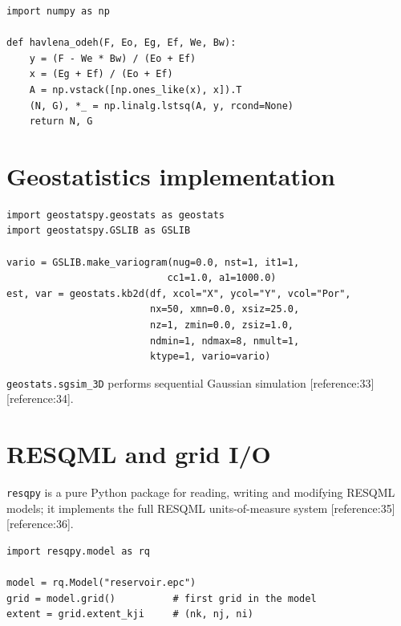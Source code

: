 \documentclass[10pt,a4paper]{article}
\begin{document}
\begin{lstlisting}[caption={Havlena--Odeh linear regression.}]
import numpy as np

def havlena_odeh(F, Eo, Eg, Ef, We, Bw):
    y = (F - We * Bw) / (Eo + Ef)
    x = (Eg + Ef) / (Eo + Ef)
    A = np.vstack([np.ones_like(x), x]).T
    (N, G), *_ = np.linalg.lstsq(A, y, rcond=None)
    return N, G
\end{lstlisting}

\section{Geostatistics implementation}

\begin{lstlisting}[caption={Variogram modelling and kriging with GeostatsPy.}]
import geostatspy.geostats as geostats
import geostatspy.GSLIB as GSLIB

vario = GSLIB.make_variogram(nug=0.0, nst=1, it1=1,
                            cc1=1.0, a1=1000.0)
est, var = geostats.kb2d(df, xcol="X", ycol="Y", vcol="Por",
                         nx=50, xmn=0.0, xsiz=25.0,
                         nz=1, zmin=0.0, zsiz=1.0,
                         ndmin=1, ndmax=8, nmult=1,
                         ktype=1, vario=vario)
\end{lstlisting}
\texttt{geostats.sgsim\_3D} performs sequential Gaussian simulation
[reference:33][reference:34].

\section{RESQML and grid I/O}

\texttt{resqpy} is a pure Python package for reading, writing and modifying
RESQML models; it implements the full RESQML units-of-measure system
[reference:35][reference:36].

\begin{lstlisting}[caption={Opening a RESQML model and accessing a grid.}]
import resqpy.model as rq

model = rq.Model("reservoir.epc")
grid = model.grid()          # first grid in the model
extent = grid.extent_kji     # (nk, nj, ni)
\end{lstlisting}
\end{document}

